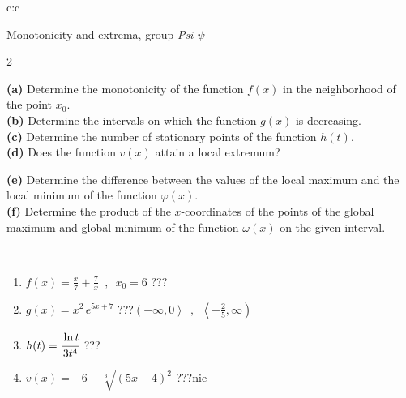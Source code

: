 \documentclass[10pt]{report}
\begin{document}
\begin{tabular}{c:c}
\begin{minipage}[c][104.5mm][t]{0.5\linewidth}
\begin{center}
\vspace{5mm}
{\huge Monotonicity and extrema, group \textit{Psi $\psi$} -}\\[5mm]
\begin{minipage}{0.95\linewidth}
\begin{center}
{\small \begin{multicols}{2} \raggedright
\textbf{(a)} Determine the monotonicity of the function \(f(x)\) in the neighborhood of the point \(x_0\). \\[1mm]
\textbf{(b)} Determine the intervals on which the function \(g(x)\) is decreasing. \\[1mm]
\textbf{(c)} Determine the number of stationary points of the function \(h(t)\). \\[1mm]
\textbf{(d)} Does the function \(v(x)\) attain a local extremum? \par \columnbreak
\textbf{(e)} Determine the difference between the values of the local maximum and the local minimum of the function \(\varphi(x)\). \\[1mm]
\textbf{(f)} Determine the product of the \(x\)-coordinates of the points of the global maximum and global minimum of the function \(\omega(x)\) on the given interval. \\[1mm]
\end{multicols}
}
\end{center}
\end{minipage}
\\[1mm]
\begin{minipage}{0.79\linewidth}
\begin{center}
\begin{varwidth}{\linewidth}
\setlength{\itemsep}{0pt}
\begin{enumerate}
\normalsize
\item $f(x)=\frac{x}{7}+\frac{7}{x} \enspace , \enspace x_0=6$\quad \dotfill\; ???\;\dotfill \quad {}
\item $g(x)=x^2\, e^{5x+7}$\quad \dotfill\; ???\;\dotfill \quad $\left(-\infty , 0\right\rangle\enspace , \enspace \left\langle-\frac{2}{5} , \infty\right)$
\item $h(t)=\cfrac{\ln t}{3t^4}$\quad \dotfill\; ???\;\dotfill {}
\item $v(x)=-6-\sqrt[3]{(5x-4)^2}$\quad \dotfill\; ???\;\dotfill \quad $\text{nie}$

\end{enumerate}
\end{varwidth}
\end{center}
\end{minipage}
\end{center}
\end{minipage}
\end{tabular}
\end{document}

